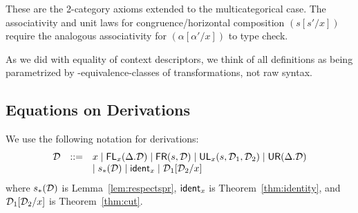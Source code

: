 \noindent These are the 2-category axioms extended to the
multicategorical case.  The associativity and unit laws for
congruence/horizontal composition $(s[s'/x])$ require the analogous
associativity for $(\alpha[\alpha'/x])$ to type check.

As we did with equality of context descriptors, we think of all
definitions as being parametrized by \deq-equivalence-classes of
transformations, not raw syntax.

\subsection{Equations on Derivations}

\newcommand\FLd[2]{\ensuremath{\FL_{#1}(#2)}}
\newcommand\FRd[2]{\ensuremath{\FR(#1,#2)}}
\newcommand\ULd[4]{\ensuremath{\UL_{#1}(#2,#3,#4)}}
\newcommand\URd[1]{\ensuremath{\UR(#1)}}
\newcommand\Trd[2]{\ensuremath{#1_*(#2)}}
\newcommand\Ident[1]{\ensuremath{\dsd{ident}_{#1}}}
\newcommand\Cut[3]{\ensuremath{#1[#2/#3]}}

We use the following notation for derivations:
\[
\begin{array}{rcl}
\D & ::= & x \mid \FLd{x}{\Delta.\D} \mid \FRd{s}{\D} \mid
\ULd{x}{s}{\D_1}{\D_2} \mid \URd{\Delta.\D} \\ 
& & \mid \Trd{s}{\D} \mid \Ident{x} \mid \Cut{\D_1}{\D_2}{x}
\end{array}
\]
where \Trd{s}{\D} is Lemma~\ref{lem:respectspr}, \Ident{x} is
Theorem~\ref{thm:identity}, and \Cut{\D_1}{\D_2}{x} is
Theorem~\ref{thm:cut}.

